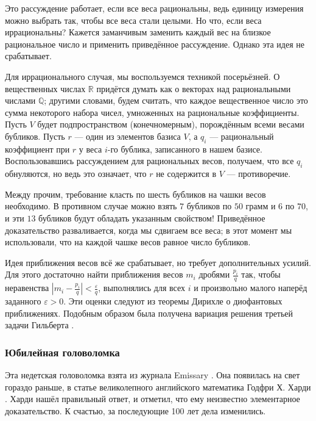 Это рассуждение работает, если все веса рациональны, ведь единицу измерения можно выбрать так, чтобы все веса стали целыми.
Но что, если веса иррациональны?
Кажется заманчивым заменить каждый вес на близкое рациональное число и применить приведённое рассуждение.
Однако эта идея не срабатывает.

Для иррационального случая, мы воспользуемся техникой посерьёзней.
О вещественных числах $\mathbb{R}$ придётся думать как о векторах над рациональными числами $\mathbb{Q}$;
другими словами, будем считать, что каждое вещественное число это сумма некоторого набора чисел, умноженных на рациональные коэффициенты.
Пусть $V$ будет подпространством (конечномерным), порождённым всеми весами бубликов.
Пусть $r$ --- один из элементов базиса $V$, а $q_i$ --- рациональный коэффициент при $r$ у веса $i$-го бублика, записанного в нашем базисе.
Воспользовавшись рассуждением для рациональных весов, получаем, что все $q_i$ обнуляются, но ведь это означает, что $r$ не содержится в $V$ --- противоречие.

Между прочим, требование класть по шесть бубликов на чашки весов необходимо.
В противном случае можно взять $7$ бубликов по $50$ грамм и $6$ по $70$, и эти $13$ бубликов будут обладать указанным свойством!
Приведённое доказательство разваливается, когда мы сдвигаем все веса;
в этот момент мы использовали, что на каждой чашке весов равное число бубликов.

\begin{addedbytheeditors}
Идея приближения весов всё же срабатывает, но требует дополнительных усилий.
Для этого достаточно найти приближения весов $m_i$ дробями $\tfrac{p_i}q$ так, чтобы неравенства
$|m_i-\tfrac{p_i}q|<\tfrac\varepsilon q$,
выполнялись для всех $i$ и произвольно малого наперёд заданного $\varepsilon>0$.
Эти оценки следуют из теоремы Дирихле о диофантовых приближениях.
Подобным образом была получена вариация решения третьей задачи Гильберта \cite{benko}.\pr
\end{addedbytheeditors}


\subsubsection*{Юбилейная головоломка}

Эта недетская головоломка взята из журнала Emissary \cite[Осень 2004]{3}.
Она появилась на свет гораздо раньше, в статье великолепного английского математика Годфри Х. Харди \cite{37}. 
Харди нашёл правильный ответ, и отметил, что ему неизвестно элементарное доказательство.
К счастью, за последующие 100 лет дела изменились.

